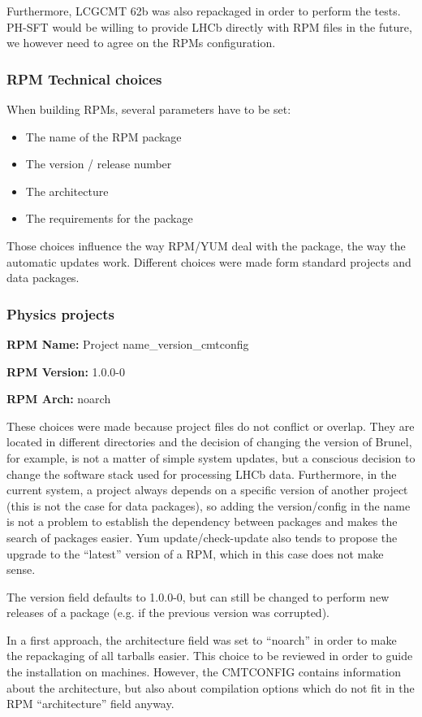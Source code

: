 \documentclass{lhcbnote}
\begin{document}
Furthermore, LCGCMT 62b was also repackaged in order to perform the tests. PH-SFT would be willing to provide LHCb directly with RPM files in the future, we however need to agree on the RPMs configuration.

\subsubsection{RPM Technical choices}

When building RPMs, several parameters have to be set:
\begin{itemize}
\item The name of the RPM package
\item The version / release number
\item The architecture
\item The requirements for the package
\end{itemize}

Those choices influence the way RPM/YUM deal with the package, the way the automatic updates work.
Different choices were made form standard projects and data packages.

\subsubsection{Physics projects}
\textbf{RPM Name:} Project name\_version\_cmtconfig

\textbf{RPM Version:} 1.0.0-0 

\textbf{RPM Arch:} noarch 

These choices were made because project files do not conflict or overlap. They are located in different directories and the decision of changing the version of Brunel, for example, is not a matter of simple system updates, but a conscious decision to change the software stack used for processing LHCb data. Furthermore, in the current system, a project always depends on a specific version of another project (this is not the case for data packages), so adding the version/config in the name is not a problem to establish the dependency between packages and makes the search of packages easier. Yum update/check-update also tends to propose the upgrade to the ``latest'' version of a RPM, which in this case does not make sense. 

The version field defaults to 1.0.0-0, but can still be changed to perform new releases of a package (e.g. if the previous version was corrupted).

In a first approach, the architecture field was set to ``noarch'' in order to make the repackaging of all tarballs easier. This choice to be reviewed in order to guide the installation on machines. However, the CMTCONFIG contains information about the architecture, but also about compilation options which do not fit in the RPM ``architecture'' field anyway.
\end{document}
